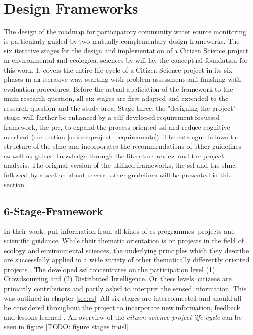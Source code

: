 \section{Design Frameworks}\label{sec:design_framework}

The design of the roadmap for participatory community water source monitoring is particularly guided by two mutually complementary design frameworks. The six iterative stages for the design and implementation of a Citizen Science project in environmental and ecological sciences by \autocite{fraislCitizenScienceEnvironmental2022} will lay the conceptual foundation for this work. It covers the entire life cycle of a Citizen Science project in its six phases in an iterative way, starting with problem assessment and finishing with evaluation procedures. Before the actual application of the framework to the main research question, all six stages are first adapted and extended to the research question and the study area. Stage three, the "designing the project" stage, will further be enhanced by a self developed requirement focussed framework, the \acrfull{prc}, to expand the process-oriented \acrshort{ssf} and reduce cognitive overload (see section \ref{subsec:project_requirements}). The catalogue follows the structure of the \acrshort{slmc} and incorporates the recommendations of other guidelines as well as gained knowledge through the literature review and the project analysis. The original version of the utilized frameworks, the \acrshort{ssf} and the \acrshort{slmc}, followed by a section about several other guidelines will be presented in this section.

\subsection{6-Stage-Framework}\label{subsec:ssf}

In their work, \autocite{fraislCitizenScienceEnvironmental2022} pull information from all kinds of \acrshort*{cs} programmes, projects and scientific guidance. While their thematic orientation is on projects in the field of ecology and environmental sciences, the underlying principles which they describe are successfully applied in a wide variety of other thematically differently oriented projects \autocite{fraislCitizenScienceEnvironmental2022}. The developed \acrfull{ssf} concentrates on the participation level (1) Crowdsourcing and (2) Distributed Intelligence. On these levels, citizens are primarily contributors and partly asked to interpret the sensed information. This was outlined in chapter \ref*{sec:cs}. All six stages are interconnected and should all be considered throughout the project to incorporate new information, feedback and lessons learned \autocite{fraislCitizenScienceEnvironmental2022}. An overview of the \textit{citizen science project life cycle} can be seen in figure \ref{TODO: figure stages fraisl}


